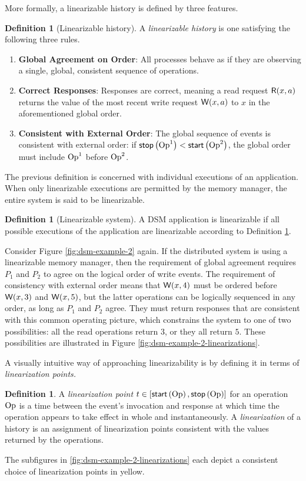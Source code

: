 \documentclass[]             %
{NASA}                       %
\theoremstyle{definition}
\newtheorem{definition}[theorem]{Definition}
\providecommand{\tightlist}{%
  \setlength{\itemsep}{0pt}\setlength{\parskip}{0pt}}
\begin{document}
More formally, a linearizable history is defined by three features.
\begin{definition}[Linearizable history]
  \label{def:linearizable}
  A \emph{linearizable history} is one satisfying the following three rules.
\begin{enumerate}
  \tightlist
\item \textbf{Global Agreement on Order}: All processes behave as if
  they are observing a single, global, consistent sequence of
  operations.
\item \textbf{Correct Responses}: Responses are correct, meaning a read request
  \(\mathsf{R}\!\left(x, a\right)\) returns the value of the most recent write request
  \(\mathsf{W}\!\left(x, a\right)\) to \(x\) in the aforementioned global order.
\item \textbf{Consistent with External Order}: The global sequence of
  events is consistent with external order: if $\mathsf{stop}\left(\mathrm{Op}^1\right) < \mathsf{start}\left(\mathrm{Op}^2\right)$,
  the global order must include $\mathrm{Op}^1$ before $\mathrm{Op}^2$.
\end{enumerate}
\end{definition}

The previous definition is concerned with individual executions of an
application. When only linearizable executions are permitted by the
memory manager, the entire system is said to be linearizable.

\begin{definition}[Linearizable system]
  A DSM application is linearizable if all possible executions of the
  application are linearizable according to Definition \ref{def:linearizable}.
\end{definition}

Consider Figure \ref{fig:dsm-example-2} again. If the distributed
system is using a linearizable memory manager, then the requirement of
global agreement requires $P_1$ and $P_2$ to agree on the logical
order of write events. The requirement of consistency with external
order means that $\mathsf{W}\!\left(x, 4\right)$ must be ordered before
$\mathsf{W}\!\left(x, 3\right)$ and $\mathsf{W}\!\left(x, 5\right)$, but the latter operations can
be logically sequenced in any order, as long as $P_1$ and $P_2$
agree. They must return responses that are consistent with this common
operating picture, which constrains the system to one of two
possibilities: all the read operations return $3$, or they all return
$5$. These possibilities are illustrated in Figure
\ref{fig:dsm-example-2-linearizations}.

A visually intuitive way of approaching linearizability is by defining
it in terms of \emph{linearization points.}
\begin{definition}
  A \emph{linearization point} $t \in [\mathsf{start}\left(\mathrm{Op}\right), \mathsf{stop}\left(\mathrm{Op}\right)]$
  for an operation $\mathrm{Op}$ is a time between the event's invocation and
  response at which time the operation appears to take effect in whole
  and instantaneously. A \emph{linearization} of a history is an
  assignment of linearization points consistent with the values
  returned by the operations.
\end{definition}
The subfigures in \ref{fig:dsm-example-2-linearizations} each depict a
consistent choice of linearization points in yellow.
\end{document}
